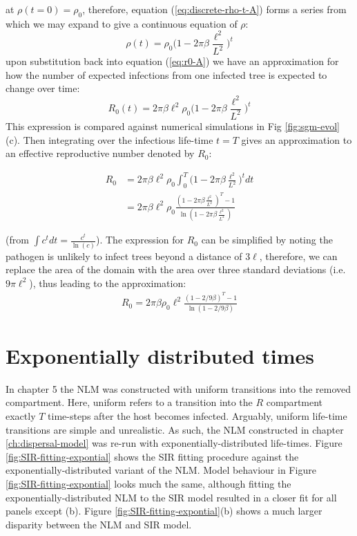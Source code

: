at $\rho(t=0)=\rho_0$, therefore, equation (\ref{eq:discrete-rho-t-A}) forms a series from which we may expand to give a continuous equation of $\rho$:
\begin{equation}
    \rho(t) = \rho_0 \big(1 - 2\pi\beta\frac{\ell^2}{L^2}\big)^t
\end{equation}{}
upon substitution back into equation (\ref{eq:r0-A}) we have an approximation for how the number of expected infections from one infected tree is expected to change over time:
\begin{equation}
    R_0(t) = 2\pi\beta\ell^2\rho_0 \big(1 - 2\pi\beta\frac{\ell^2}{L^2} \big)^t
    \label{eq:Rt-A}
\end{equation}{}
This expression is compared against numerical simulations in Fig \ref{fig:sgm-evol}(c). Then integrating over the infectious life-time $t=T$ gives an approximation to an effective reproductive number denoted by $R_0$:

\begin{equation} \label{eq1}
\begin{split}
R_0 & = 2\pi\beta\ell^2\rho_0 \int ^T _0 \big(1 - 2\pi\beta\frac{\ell^2}{L^2} \big)^t dt \\
 & = 2\pi\beta\ell^2\rho_0 \frac{ (1 - 2\pi \beta\frac{\ell^2}{L^2})^T - 1}{\ln(1 - 2\pi\beta\frac{\ell^2}{L^2})}
\end{split}
\end{equation}

(from $\int c^t dt = \frac{c^t}{\ln(c)}$). The expression for $R_0$ can be simplified by noting the pathogen is unlikely to infect trees beyond a distance of $3\ell$, therefore, we can replace the area of the domain with the area over three standard deviations (i.e. $9\pi\ell^2$), thus leading to the approximation:
\begin{align*}
    R_0 = 2\pi\beta\rho_0\ell^2 \frac{(1 - 2/9\beta)^T - 1}{\ln(1-2/9\beta)}
\end{align*}

\section{Exponentially distributed times}

In chapter 5 the NLM was constructed with uniform transitions into the removed compartment. 
Here, uniform refers to a transition into the $R$ compartment exactly $T$ time-steps after the host becomes infected.
Arguably, uniform life-time transitions are simple and unrealistic.
As such, the NLM constructed in chapter \ref{ch:dispersal-model} was re-run with exponentially-distributed life-times. 
Figure \ref{fig:SIR-fitting-expontial} shows the SIR fitting procedure against the exponentially-distributed variant of the NLM. 
Model behaviour in Figure \ref{fig:SIR-fitting-expontial} looks much the same, although fitting the exponentially-distributed NLM to the SIR model resulted in a closer fit for all panels except (b). 
Figure \ref{fig:SIR-fitting-expontial}(b) shows a much larger disparity between the NLM and SIR model.

